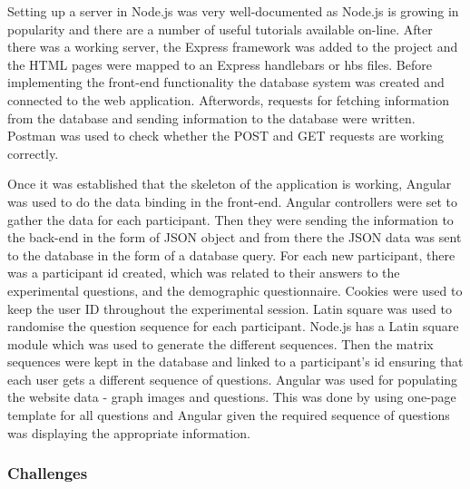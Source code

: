 \documentclass{l4proj}
\begin{document}
Setting up a server in Node.js was very well-documented as Node.js is growing in popularity and there are a number of useful tutorials available on-line. After there was a working server, the Express framework was added to the project and the HTML pages were mapped to an Express handlebars or hbs files. Before implementing the front-end functionality the database system was created and connected to the web application. Afterwords, requests for fetching information from the database and sending information to the database were written. Postman was used to check whether the POST and GET requests are working correctly. 

Once it was established that the skeleton of the application is working, Angular was used to do the data binding in the front-end. Angular controllers were set to gather the data for each participant. Then they were sending the information to the back-end in the form of JSON object and from there the JSON data was sent to the database in the form of a database query. For each new participant, there was a participant id created, which was related to their answers to the experimental questions, and the demographic questionnaire. Cookies were used to keep the user ID throughout the experimental session. Latin square was used to randomise the question sequence for each participant. Node.js has a Latin square module which was used to generate the different sequences. Then the matrix sequences were kept in the database and linked to a participant's id ensuring that each user gets a different sequence of questions. Angular was used for populating the website data - graph images and questions. This was done by using one-page template for all questions and Angular given the required sequence of questions was displaying the appropriate information. 

\subsubsection{Challenges}
\end{document}
